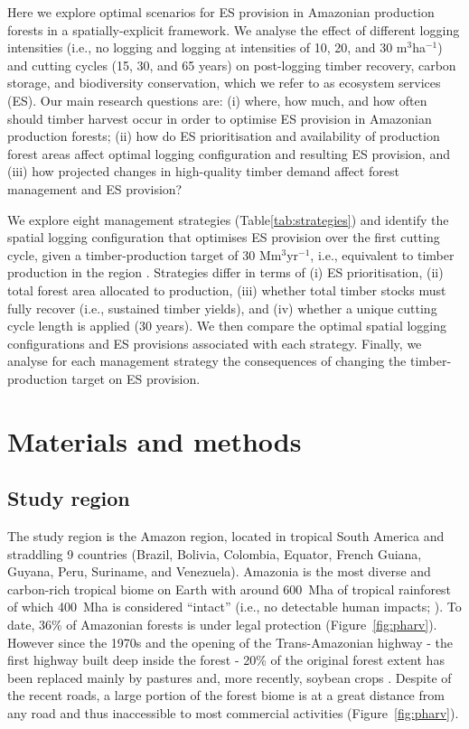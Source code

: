 \documentclass{article}
\begin{document}
Here we explore optimal scenarios for ES provision in Amazonian production forests in a spatially-explicit framework. We analyse the effect of different logging intensities (i.e., no logging and logging at intensities of 10, 20, and 30 m$^3$ha$^{-1}$) and cutting cycles (15, 30, and 65 years) on post-logging timber recovery, carbon storage, and biodiversity conservation, which we refer to as ecosystem services (ES). Our main research questions are: (i) where, how much, and how often should timber harvest occur in order to optimise ES provision in Amazonian production forests; (ii) how do ES prioritisation and availability of production forest areas affect optimal logging configuration and resulting ES provision, and (iii) how projected changes in high-quality timber demand affect forest management and ES provision? 

We explore eight management strategies (Table\ref{tab:strategies}) and identify the spatial logging configuration that optimises ES provision over the first cutting cycle, given a timber-production target of 30 Mm$^3$yr$^{-1}$, i.e., equivalent to timber production in the region \cite{Lentini2005}. Strategies differ in terms of (i) ES prioritisation, (ii) total forest area allocated to production, (iii) whether total timber stocks must fully recover (i.e., sustained timber yields), and (iv) whether a unique cutting cycle length is applied (30 years). We then compare the optimal spatial logging configurations and ES provisions associated with each strategy. Finally, we analyse for each management strategy the consequences of changing the timber-production target on ES provision.

\section{Materials and methods}

\subsection{Study region}

The study region is the Amazon region, located in tropical South America and straddling 9 countries (Brazil, Bolivia, Colombia, Equator, French Guiana, Guyana, Peru, Suriname, and Venezuela). Amazonia is the most diverse and carbon-rich tropical biome on Earth \cite{Avitabile2016,Pimm2014} with around 600~Mha of tropical rainforest of which 400~Mha is considered “intact” (i.e., no detectable human impacts; \cite{Potapov2017}). To date, 36\% of Amazonian forests is under legal protection \cite{WDPA2016} (Figure~\ref{fig:pharv}). However since the 1970s and the opening of the Trans-Amazonian highway - the first highway built deep inside the forest - 20\% of the original forest extent has been replaced mainly by pastures and, more recently, soybean crops \cite{Kalamandeen2018,Fearnside2017}. Despite of the recent roads, a large portion of the forest biome is at a great distance from any road and thus inaccessible to most commercial activities (Figure~\ref{fig:pharv}).
\end{document}
